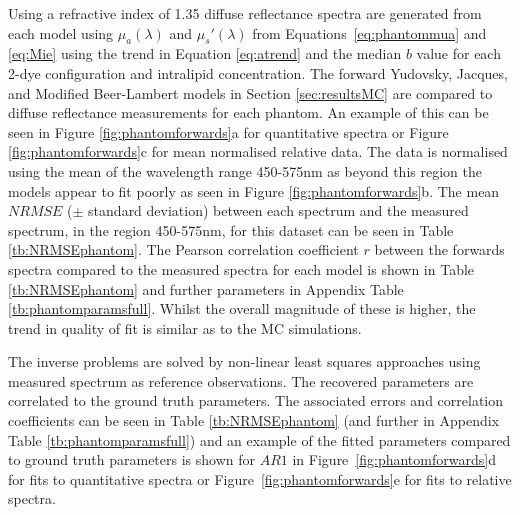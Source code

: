 Using a refractive index of 1.35\cite{Pogue2006} diffuse reflectance spectra are generated from each model using $\mu_a(\lambda)$ and $\mu_s'(\lambda)$ from Equations~\eqref{eq:phantommua} and \eqref{eq:Mie} using the trend in Equation \eqref{eq:atrend} and the median $b$ value for each 2-dye configuration and intralipid concentration. The forward Yudovsky, Jacques, and Modified Beer-Lambert models in Section \ref{sec:resultsMC} are compared to diffuse reflectance measurements for each phantom.
An example of this can be seen in Figure \ref{fig:phantomforwards}a for quantitative spectra or Figure \ref{fig:phantomforwards}c for mean normalised relative data.
The data is normalised using the mean of the wavelength range 450-575nm as beyond this region the models appear to fit poorly as seen in Figure \ref{fig:phantomforwards}b. 
The mean $NRMSE$ ($\pm$ standard deviation) between each spectrum and the measured spectrum, in the region 450-575nm, for this dataset can be seen in Table \ref{tb:NRMSEphantom}. 
The Pearson correlation coefficient $r$ between the forwards spectra compared to the measured spectra for each model is shown in Table \ref{tb:NRMSEphantom} and further parameters in Appendix Table \ref{tb:phantomparamsfull}. Whilst the overall magnitude of these is higher, the trend in quality of fit is similar as to the MC simulations. 

The inverse problems are solved by non-linear least squares  approaches using measured spectrum as reference observations. The recovered parameters are correlated to the ground truth parameters. The associated errors and correlation coefficients can be seen in Table \ref{tb:NRMSEphantom} (and further in Appendix Table \ref{tb:phantomparamsfull}) and an example of the fitted parameters compared to ground truth parameters is shown for $AR1$ in Figure~\ref{fig:phantomforwards}d for fits to quantitative spectra or Figure~\ref{fig:phantomforwards}e for fits to 
relative spectra.

